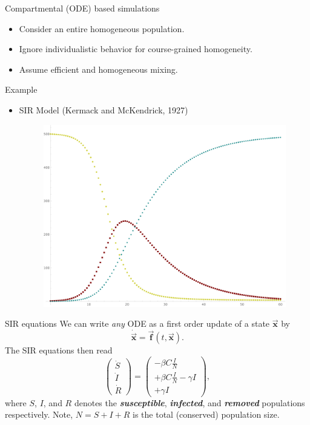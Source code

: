 \documentclass[aspectratio=169]{beamer}
\newcommand{\vecx}{\boldsymbol{\vec{x}}}
\newcommand{\vecf}{\boldsymbol{\vec{f}}}
\newcommand{\xdot}{\boldsymbol{\dot{\vec{x}}}}
\newcommand\boldgreen[1]{\textcolor{lighter_csu_green}{\emph{\textbf{#1}}}}
\begin{document}
\begin{frame}{Compartmental (ODE) based simulations}
    \vfill
    \begin{itemize}
    \pause
        \item Consider an entire homogeneous population.
        \pause
        \item Ignore individualistic behavior for course-grained homogeneity.
        \pause
        \item Assume efficient and homogeneous mixing.
    \end{itemize}
    \vfill
\end{frame}

\begin{frame}{Example}
    \vfill
    \begin{itemize}
    \pause
        \item SIR Model (Kermack and McKendrick, 1927)
        \vspace*{1cm}
        \begin{figure}[H]
            \centering
            \includegraphics[width=.5\textwidth]{figures/sir_curves.png}
        \end{figure}
    \end{itemize}
    \vfill
\end{frame}

\begin{frame}{SIR equations}
    \vfill
    \pause
    We can write \emph{any} ODE as a first order update of a state $\vecx$ by
    \[
    \xdot = \vecf(t,\vecx).
    \]
    The SIR equations then read
    \[
    \begin{pmatrix} \dot{S} \\ \dot{I} \\ \dot{R} \end{pmatrix} = \begin{pmatrix} -\beta C \frac{I}{N} \\ +\beta C \frac{I}{N} - \gamma I \\ + \gamma I \end{pmatrix}, 
    \]
    where $S$, $I$, and $R$ denotes the \boldgreen{susceptible}, \boldgreen{infected}, and \boldgreen{removed} populations respectively. Note, $N=S+I+R$ is the total (conserved) population size.
    \vfill
\end{frame}
\end{document}

